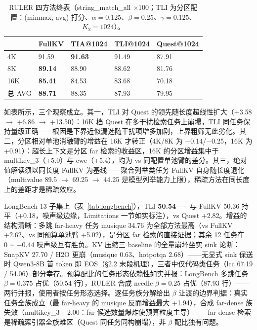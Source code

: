 \documentclass[11pt]{article}
\begin{document}
\begin{table}[h]\centering
\caption{RULER 四方法终表（string\_match\_all $\times$100；TLI 为分区配置：(minmax, avg) 打分、$\alpha{=}0.125$、$\beta{=}0.25$、$\gamma{=}0.125$、$K_2{=}1024$）。}
\begin{tabular}{lllll}
\toprule
 & FullKV & TIA@1024 & TLI@1024 & Quest@1024 \\
\midrule
4K & 91.59 & \textbf{91.63} & 91.49 & 87.91 \\
8K & \textbf{89.14} & 88.90 & 88.62 & 81.76 \\
16K & \textbf{85.41} & 84.53 & 83.68 & 70.18 \\
总 AVG & \textbf{88.71} & 88.35 & 87.93 & 79.95 \\
\bottomrule
\end{tabular}
\end{table}

如表所示，三个观察成立。其一，TLI 对 Quest 的领先随长度超线性扩大（+3.58 $\rightarrow$ +6.86 $\rightarrow$ +13.50）：16K 档 Quest 在多干扰检索任务上崩塌，TLI 同任务保持量级正确——根因是下界近似漏选随干扰项增多加剧，上界粗筛无此劣化。其二，分区相对单池消融臂的增益在 16K 才转正（4K/8K 为 $-$0.14/$-$0.25，16K 为 +0.91）：超长上下文是分区 far 检索的收益区，16K 的分区增益集中于 multikey\_3（+5.0）与 cwe（+5.4），均为 vs 同配置单池臂的差分。其三，绝对值解读须以同长度 FullKV 为基线——聚合列举类任务 FullKV 自身随长度退化（multivalue 89.5 $\rightarrow$ 69.25 $\rightarrow$ 44.25 是模型列举能力上限），稀疏方法在同长度上的差距才是稀疏效应。

LongBench 13 子集上（表~\ref{tab:longbench}），TLI \textbf{50.54}——与 FullKV 50.36 持平（+0.18，噪声级边缘，Limitations 一节如实标注），vs Quest +2.82。增益的结构清晰：多跳 far-heavy 任务 musique 34.76 为全部方法最高（vs FullKV +2.62、vs 同预算单池臂 +5.02），是分区 far 检索的直接证据；其余 12 任务在 $0\sim-0.44$ 噪声级互有胜负。KV 压缩三 baseline 的全量崩坏坐实 sink 论断：SnapKV 27.70 / H2O 更崩（musique 0.63、hotpotqa 2.68）——无显式 sink 保送时 Qwen3-8B 首 token 即 EOS（§2.2 末段机理），三者中仅代码类任务（lcc 67.19 / 54.06）部分幸存。预算配比的任务形态依赖性如实并报：LongBench 多跳任务 $\beta{=}0.375$ 占优（50.54 行），RULER 合成 needle $\beta{=}0.25$ 占优（87.93 行）——两行并报，使用者按任务形态选择。逐任务族分解给出 $\beta$ 让渡的边界判据：真实任务全族成立（最 far-heavy 的 musique 反而增益最大 +1.94），合成 far-dense 族失效（multikey\_3 $-$2.00：far 候选数量爆炸使预算粒度主导）——far-dense 检索是稀疏索引器全族难区（Quest 同任务同构崩塌），非 $\beta$ 配比独有问题。
\end{document}
